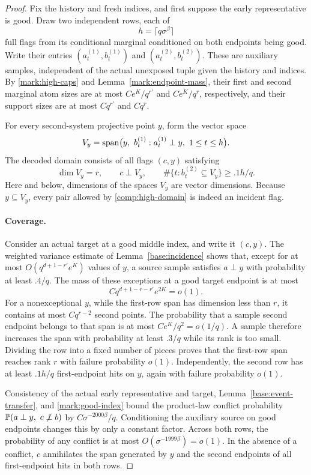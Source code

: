 \begin{proof}
Fix the history and fresh indices, and first suppose the early
representative is good. Draw two independent rows, each of
\[
 h=\lceil q\sigma^\beta\rceil
\]
full flags from its conditional marginal conditioned on both
endpoints being good. Write their entries
\((a_t^{(1)},b_t^{(1)})\) and \((a_t^{(2)},b_t^{(2)})\).
These are auxiliary samples, independent of the actual unexposed
tuple given the history and indices. By
\eqref{mark:high-caps} and Lemma~\ref{mark:endpoint-mass},
their first and second marginal atom sizes are at most
\(Ce^K/q^{r'}\) and \(Ce^K/q^r\), respectively, and their
support sizes are at most \(Cq^{r'}\) and \(Cq^r\).

For every second-system projective point \(y\), form the vector space
\[
 V_y=\Span\bigl(y,\ b_t^{(1)}:
                          a_t^{(1)}\perp y,\ 1\le t\le h\bigr).
\]
The decoded domain consists of all flags \((c,y)\) satisfying
\begin{equation}\label{comp:high-domain}
 \dim V_y=r,\qquad c\perp V_y,\qquad
 \#\{t:b_t^{(2)}\subseteq V_y\}\ge .1h/q.
\end{equation}
Here and below, dimensions of the spaces \(V_y\) are vector
dimensions. Because \(y\subseteq V_y\), every pair allowed by
\eqref{comp:high-domain} is indeed an incident flag.

\paragraph{Coverage.}
Consider an actual target at a good middle index, and write it
\((c,y)\). The weighted variance estimate of
Lemma~\ref{base:incidence} shows that, except for at most
\(O(q^{d+1-r'}e^K)\) values of \(y\), a source sample satisfies
\(a\perp y\) with probability at least \(.4/q\).
The mass of these exceptions at a good target endpoint is at most
\[
 Cq^{d+1-r-r'}e^{2K}=o(1).
\]
For a nonexceptional \(y\), while the first-row span has dimension
less than \(r\), it contains at most \(Cq^{r-2}\) second points.
The probability that a sample second endpoint belongs to that span
is at most \(Ce^K/q^2=o(1/q)\). A sample therefore increases the
span with probability at least \(.3/q\) while its rank is too small.
Dividing the row into a fixed number of pieces proves that the
first-row span reaches rank \(r\) with failure probability \(o(1)\).
Independently, the second row has at least \(.1h/q\) first-endpoint
hits on \(y\), again with failure probability \(o(1)\).

Consistency of the actual early representative and target,
Lemma~\ref{base:event-transfer}, and \eqref{mark:good-index} bound
the product-law conflict probability
\(\mathbb P(a\perp y,\ c\not\perp b)\) by
\(C\sigma^{-2000\beta}/q\).
Conditioning the auxiliary source on good endpoints changes this
by only a constant factor. Across both rows, the probability of
any conflict is at most
\(O(\sigma^{-1999\beta})=o(1)\).
In the absence of a conflict, \(c\) annihilates the span generated by
\(y\) and the second endpoints of all first-endpoint hits in both
rows.


\end{proof}

